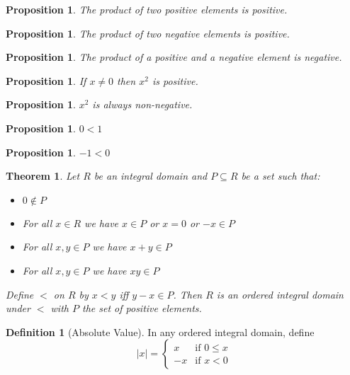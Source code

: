 \documentclass{article}
\newtheorem{proposition}[axiom]{Proposition}
\newtheorem{theorem}[axiom]{Theorem}
\theoremstyle{definition}
\newtheorem{definition}[axiom]{Definition}
\begin{document}
    \begin{proposition}
        The product of two positive elements is positive.
    \end{proposition}

    \begin{proposition}
        The product of two negative elements is positive.
    \end{proposition}

    \begin{proposition}
        The product of a positive and a negative element is negative.
    \end{proposition}

    \begin{proposition}
        If $x \neq 0$ then $x^2$ is positive.
    \end{proposition}

    \begin{proposition}
        $x^2$ is always non-negative.
    \end{proposition}

    \begin{proposition}
        $0 < 1$
    \end{proposition}

    \begin{proposition}
        $-1 < 0$
    \end{proposition}

    \begin{theorem}
        Let $R$ be an integral domain and $P \subseteq R$ be a set such that:
        \begin{itemize}
            \item $0 \notin P$
            \item For all $x \in R$ we have $x \in P$ or $x = 0$ or $-x \in P$
            \item For all $x,y \in P$ we have $x+y \in P$
            \item For all $x,y \in P$ we have $xy \in P$
        \end{itemize}
        Define $<$ on $R$ by $x < y$ iff $y - x \in P$. Then $R$ is an ordered integral domain under $<$
        with $P$ the set of positive elements.
    \end{theorem}

    \begin{definition}[Absolute Value]
        In any ordered integral domain, define
        \[ |x| = \begin{cases}
            x & \text{if $0 \leq x$} \\
            -x & \text{if $x < 0$}
        \end{cases} \]
    \end{definition}
\end{document}
